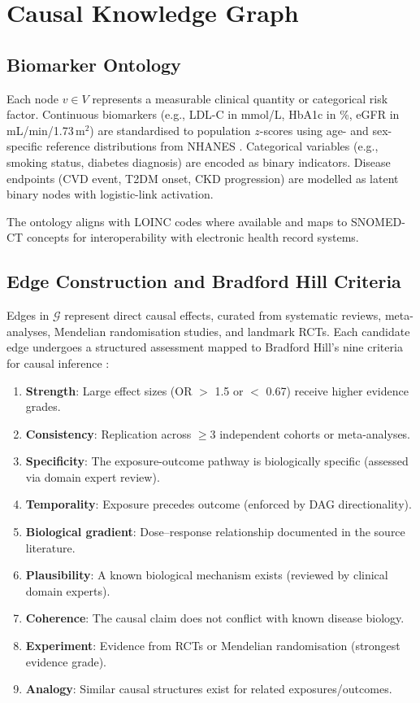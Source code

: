 \documentclass[runningheads]{llncs}
\begin{document}
\section{Causal Knowledge Graph}\label{sec:kg}

\subsection{Biomarker Ontology}\label{sec:ontology}

Each node $v \in V$ represents a measurable clinical quantity or
categorical risk factor.  Continuous biomarkers (e.g., LDL-C in
mmol/L, HbA1c in \%, eGFR in mL/min/1.73\,m$^2$) are standardised to
population $z$-scores using age- and sex-specific reference
distributions from NHANES \cite{nhanes2020}.  Categorical variables
(e.g., smoking status, diabetes diagnosis) are encoded as binary
indicators.  Disease endpoints (CVD event, T2DM onset, CKD
progression) are modelled as latent binary nodes with logistic-link
activation.

The ontology aligns with LOINC codes where available and maps to
SNOMED-CT concepts for interoperability with electronic health record
systems.

\subsection{Edge Construction and Bradford Hill Criteria}
\label{sec:edges}

Edges in $\mathcal{G}$ represent direct causal effects, curated from
systematic reviews, meta-analyses, Mendelian randomisation studies,
and landmark RCTs.  Each candidate edge undergoes a structured
assessment mapped to Bradford Hill's nine criteria for causal
inference \cite{hill1965environment}:

\begin{enumerate}
\item \textbf{Strength}: Large effect sizes (OR $>$ 1.5 or $<$ 0.67)
  receive higher evidence grades.
\item \textbf{Consistency}: Replication across $\geq 3$ independent
  cohorts or meta-analyses.
\item \textbf{Specificity}: The exposure-outcome pathway is
  biologically specific (assessed via domain expert review).
\item \textbf{Temporality}: Exposure precedes outcome (enforced by
  DAG directionality).
\item \textbf{Biological gradient}: Dose--response relationship
  documented in the source literature.
\item \textbf{Plausibility}: A known biological mechanism exists
  (reviewed by clinical domain experts).
\item \textbf{Coherence}: The causal claim does not conflict with
  known disease biology.
\item \textbf{Experiment}: Evidence from RCTs or Mendelian
  randomisation (strongest evidence grade).
\item \textbf{Analogy}: Similar causal structures exist for related
  exposures/outcomes.
\end{enumerate}
\end{document}

